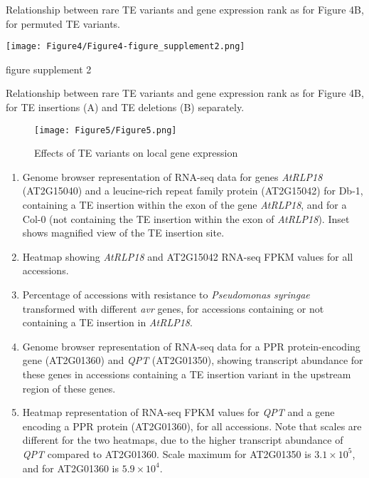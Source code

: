 \documentclass[12pt]{article}
\begin{document}
Relationship between rare TE variants and gene expression rank as for
Figure 4B, for permuted TE variants.

\pagebreak


\setcounter{suppfigure}{3}

\begin{suppfigure}
  \centering
  \texttt{[image: Figure4/Figure4-figure\_supplement2.png]}
  \caption{figure supplement 2}
  \label{fig4s2}
\end{suppfigure}

Relationship between rare TE variants and gene expression rank as for
Figure 4B, for TE insertions (A) and TE deletions (B) separately.

\pagebreak


\begin{figure}[!ht]
  \centering
  \texttt{[image: Figure5/Figure5.png]}
  \caption{Effects of TE variants on local gene expression}
  \label{fig5}
\end{figure}

\begin{enumerate}
  \def\labelenumi{(\Alph{enumi})}
\item
  Genome browser representation of RNA-seq data for genes \emph{AtRLP18}
  (AT2G15040) and a leucine-rich repeat family protein (AT2G15042) for
  Db-1, containing a TE insertion within the exon of the gene
  \emph{AtRLP18}, and for a Col-0 (not containing the TE insertion
  within the exon of \emph{AtRLP18}). Inset shows magnified view of the
  TE insertion site.
\item
  Heatmap showing \emph{AtRLP18 }and AT2G15042 RNA-seq FPKM values for
  all accessions.
\item
  Percentage of accessions with resistance to \emph{Pseudomonas syringae
  }transformed with different \emph{avr }genes, for accessions
  containing or not containing a TE insertion in \emph{AtRLP18}.
\item
  Genome browser representation of RNA-seq data for a PPR
  protein-encoding gene (AT2G01360) and \emph{QPT }(AT2G01350), showing
  transcript abundance for these genes in accessions containing a TE
  insertion variant in the upstream region of these genes.
\item
  Heatmap representation of RNA-seq FPKM values for \emph{QPT }and a
  gene encoding a PPR protein (AT2G01360), for all accessions. Note that
  scales are different for the two heatmaps, due to the higher
  transcript abundance of \emph{QPT} compared to AT2G01360. Scale
  maximum for AT2G01350 is $3.1\times10^5$, and for AT2G01360 is $5.9\times10^4$.
\end{enumerate}
\end{document}
